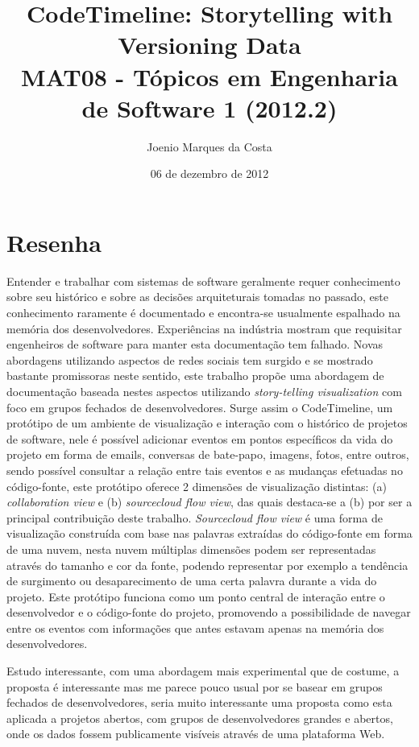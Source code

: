 \documentclass[12pt]{article}
\title{CodeTimeline: Storytelling with Versioning Data\cite{CodeTimeline} \\
 \large MAT08 - Tópicos em Engenharia de Software 1 (2012.2)}
\author{Joenio Marques da Costa}
\date{06 de dezembro de 2012}
\begin{document}
\maketitle

\section*{Resenha}

Entender e trabalhar com sistemas de software geralmente requer conhecimento
sobre seu histórico e sobre as decisões arquiteturais tomadas no passado, este
conhecimento raramente é documentado e encontra-se usualmente espalhado na
memória dos desenvolvedores. Experiências na indústria mostram que requisitar
engenheiros de software para manter esta documentação tem falhado. Novas
abordagens utilizando aspectos de redes sociais tem surgido e se mostrado
bastante promissoras neste sentido, este trabalho propõe uma abordagem de
documentação baseada nestes aspectos utilizando {\it story-telling
visualization} com foco em grupos fechados de desenvolvedores. Surge assim o
{\sc CodeTimeline}, um protótipo de um ambiente de visualização e interação com
o histórico de projetos de software, nele é possível adicionar eventos em
pontos específicos da vida do projeto em forma de emails, conversas de
bate-papo, imagens, fotos, entre outros, sendo possível consultar a relação
entre tais eventos e as mudanças efetuadas no código-fonte, este protótipo
oferece 2 dimensões de visualização distintas: (a) {\it collaboration view} e
(b) {\it sourcecloud flow view}, das quais destaca-se a (b) por ser a principal
contribuição deste trabalho. {\it Sourcecloud flow view} é uma forma de
visualização construída com base nas palavras extraídas do código-fonte em
forma de uma nuvem, nesta nuvem múltiplas dimensões podem ser representadas
através do tamanho e cor da fonte, podendo representar por exemplo a tendência
de surgimento ou desaparecimento de uma certa palavra durante a vida do
projeto. Este protótipo funciona como um ponto central de interação entre o
desenvolvedor e o código-fonte do projeto, promovendo a possibilidade de
navegar entre os eventos com informações que antes estavam apenas na memória
dos desenvolvedores.

Estudo interessante, com uma abordagem mais experimental que de costume, a
proposta é interessante mas me parece pouco usual por se basear em grupos
fechados de desenvolvedores, seria muito interessante uma proposta como esta
aplicada a projetos abertos, com grupos de desenvolvedores grandes e abertos,
onde os dados fossem publicamente visíveis através de uma plataforma Web.


\end{document}
